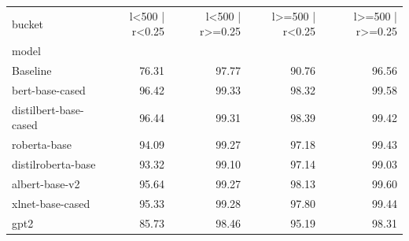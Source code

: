 \begin{tabular}{lrrrr}
\toprule
bucket & l<500 | r<0.25 & l<500 | r>=0.25 & l>=500 | r<0.25 & l>=500 | r>=0.25 \\
model &  &  &  &  \\
\midrule
Baseline & 76.31 & 97.77 & 90.76 & 96.56 \\
bert-base-cased & 96.42 & 99.33 & 98.32 & 99.58 \\
distilbert-base-cased & 96.44 & 99.31 & 98.39 & 99.42 \\
roberta-base & 94.09 & 99.27 & 97.18 & 99.43 \\
distilroberta-base & 93.32 & 99.10 & 97.14 & 99.03 \\
albert-base-v2 & 95.64 & 99.27 & 98.13 & 99.60 \\
xlnet-base-cased & 95.33 & 99.28 & 97.80 & 99.44 \\
gpt2 & 85.73 & 98.46 & 95.19 & 98.31 \\
\bottomrule
\end{tabular}
